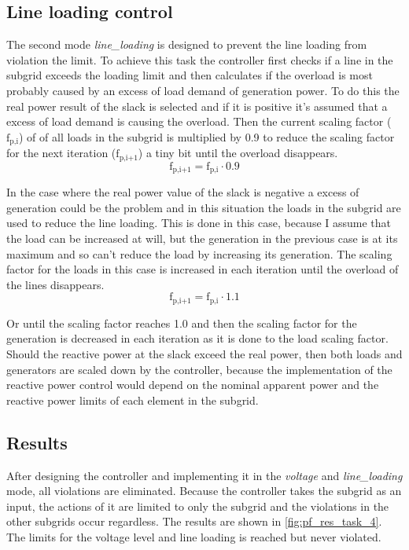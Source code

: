 \documentclass[conference]{IEEEtran}
\begin{document}
\subsection*{Line loading control}
The second mode \textit{line\_loading} is designed to prevent the line loading from violation the limit. To achieve this task the controller first checks if a line in the subgrid exceeds the loading limit and then calculates if the overload is most probably caused by an excess of load demand of generation power. To do this the real power result of the slack is selected and if it is positive it's assumed that a excess of load demand is causing the overload. Then the current scaling factor ($\text{f}_{\text{p,i}}$) of of all loads in the subgrid is multiplied by 0.9 to reduce the scaling factor for the next iteration ($\text{f}_{\text{p,i+1}}$) a tiny bit until the overload disappears.
\begin{equation}
	\text{f}_{\text{p,i+1}} = \text{f}_{\text{p,i}} \cdot 0.9
\end{equation}

In the case where the real power value of the slack is negative a excess of generation could be the problem and in this situation the loads in the subgrid are used to reduce the line loading. This is done in this case, because I assume that the load can be increased at will, but the generation in the previous case is at its maximum and so can't reduce the load by increasing its generation. The scaling factor for the loads in this case is increased in each iteration until the overload of the lines disappears. 
\begin{equation}
	\text{f}_{\text{p,i+1}} = \text{f}_{\text{p,i}} \cdot 1.1
\end{equation}

Or until the scaling factor reaches 1.0 and then the scaling factor for the generation is decreased in each iteration as it is done to the load scaling factor. Should the reactive power at the slack exceed the real power, then both loads and generators are scaled down by the controller, because the implementation of the reactive power control would depend on the nominal apparent power and the reactive power limits of each element in the subgrid.
\subsection{Results}
After designing the controller and implementing it in the \textit{voltage} and \textit{line\_loading} mode, all violations are eliminated. Because the controller takes the subgrid as an input, the actions of it are limited to only the subgrid and the violations in the other subgrids occur regardless. The results are shown in \cref{fig:pf_res_task_4}. The limits for the voltage level and line loading is reached but never violated.
\end{document}
